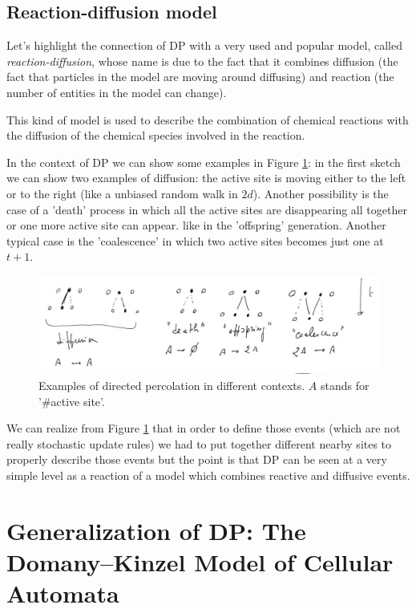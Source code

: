 \documentclass[\main/main.tex]{subfiles}
\begin{document}

\subsection{Reaction-diffusion model}
Let's highlight the connection of DP with a very used and popular model, called \textit{reaction-diffusion}, whose name is due to the fact that it combines diffusion (the fact that particles in the model are moving around diffusing) and reaction (the number of entities in the model can change).

This kind of model is used to describe the combination of chemical reactions with the diffusion of the chemical species involved in the reaction.

In the context of DP we can show some examples in Figure \ref{fig:rd}: in the first sketch we can show two examples of diffusion: the active site is moving either to the left or to the right (like a unbiased random walk in $2d$). Another possibility is the case of a 'death' process in which all the active sites are disappearing all together or one more active site can appear. like in the 'offspring' generation. 
Another typical case is the 'coalescence' in which two active sites becomes just one at $t+1$.

\begin{figure}[ht]
    \centering
    \includegraphics[width=\linewidth]{Lectures/Images/sas.jpg}
    \caption{Examples of directed percolation in different contexts. $A$ stands for '\#active site'.}
    \label{fig:rd}
\end{figure}

We can realize from Figure \ref{fig:rd} that in order to define those events (which are not really stochastic update rules) we had to put together different nearby sites to properly describe those events but the point is that DP can be seen at a very simple level as a reaction of a model which combines reactive and diffusive events.

\section{Generalization of DP: The Domany–Kinzel Model of Cellular Automata}
\end{document}
